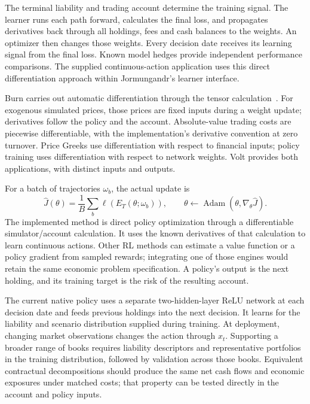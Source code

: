 \documentclass[8pt]{strategynet-journal}
\begin{document}
\begin{SNcolumns}
The terminal liability and trading account determine the training signal.
The learner runs each path forward, calculates the final loss, and propagates
derivatives back through all holdings, fees and cash balances to the weights.
An optimizer then changes those weights. Every decision date receives its learning signal from the final loss.
Known model hedges provide independent performance comparisons. The supplied continuous-action application uses
this direct differentiation approach within Jormungandr's learner interface.

Burn carries out automatic differentiation through the tensor calculation~\cite{burn}.
For exogenous simulated prices, those prices are fixed inputs during a weight
update; derivatives follow the policy and the account. Absolute-value trading
costs are piecewise differentiable, with the implementation's derivative
convention at zero turnover. Price Greeks use differentiation with respect
to financial inputs; policy training uses differentiation with respect to
network weights. Volt provides both applications, with distinct inputs and outputs.

For a batch of trajectories $\omega_b$, the actual update is
\begin{equation}
 \widehat J(\theta)=\frac1B\sum_b\ell(E_T(\theta;\omega_b)),\qquad
 \theta\leftarrow\operatorname{Adam}(\theta,\nabla_\theta\widehat J).
\end{equation}
The implemented method is direct policy optimization through a differentiable
simulator/account calculation. It uses the known derivatives of that calculation
to learn continuous actions. Other RL methods can estimate a value function
or a policy gradient from sampled rewards; integrating one of those engines
would retain the same economic problem specification. A policy's output is
the next holding, and its training target is the risk of the resulting account.

The current native policy uses a separate two-hidden-layer ReLU network at
each decision date and feeds previous holdings into the next decision.
It learns for the liability and scenario distribution supplied during training.
At deployment, changing market observations changes the action through
$x_t$. Supporting a broader range of books requires liability descriptors
and representative portfolios in the training distribution, followed by
validation across those books. Equivalent contractual decompositions should
produce the same net cash flows and economic exposures under matched costs;
that property can be tested directly in the account and policy inputs.

\end{SNcolumns}
\end{document}
